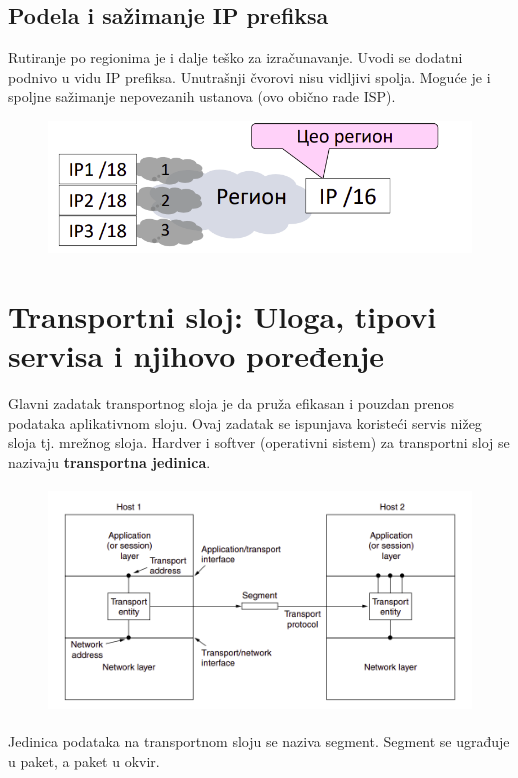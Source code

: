 \documentclass[a4paper]{article}
\begin{document}
    \subsection{Podela i sažimanje IP prefiksa}
        Rutiranje po regionima je i dalje teško za izračunavanje. Uvodi se dodatni podnivo
        u vidu IP prefiksa. Unutrašnji čvorovi nisu vidljivi spolja. Moguće je i spoljne
        sažimanje nepovezanih ustanova (ovo obično rade ISP).
        \begin{figure}[H]
            \begin{center}
                \includegraphics[width=120mm,height=35mm]{Slike/rutiranje_sazimanje.png}
            \end{center}
        \end{figure}

\section{Transportni sloj: Uloga, tipovi servisa i njihovo poređenje}
    Glavni zadatak transportnog sloja je da pruža efikasan i pouzdan prenos podataka aplikativnom
    sloju. Ovaj zadatak se ispunjava koristeći servis nižeg sloja tj. mrežnog sloja. Hardver i softver
    (operativni sistem) za transportni sloj se nazivaju \textbf{transportna jedinica}. 
    \begin{figure}[H]
        \begin{center}
            \includegraphics[width=120mm,height=60mm]{Slike/transportni_sloj1.png}
        \end{center}
    \end{figure}
    Jedinica podataka na transportnom sloju se naziva segment. Segment se ugrađuje u paket, a
    paket u okvir. \\
\end{document}
